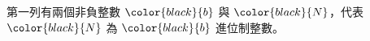 第一列有兩個非負整數 $\color{black}{b}$ 與 $\color{black}{N}$，代表 $\color{black}{N}$ 為 $\color{black}{b}$ 進位制整數。\\
